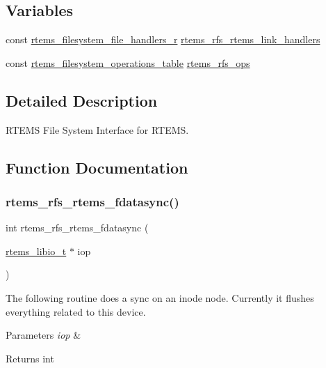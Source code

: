 \subsection*{Variables}
\begin{DoxyCompactItemize}
\item 
const \mbox{\hyperlink{struct__rtems__filesystem__file__handlers__r}{rtems\+\_\+filesystem\+\_\+file\+\_\+handlers\+\_\+r}} \mbox{\hyperlink{rtems-rfs-rtems_8c_a1b1aa463d7b6bd01b968b2d557dd33dd}{rtems\+\_\+rfs\+\_\+rtems\+\_\+link\+\_\+handlers}}
\item 
const \mbox{\hyperlink{struct__rtems__filesystem__operations__table}{rtems\+\_\+filesystem\+\_\+operations\+\_\+table}} \mbox{\hyperlink{rtems-rfs-rtems_8c_a7ad51127fb7bd67172b491a6dfb7d4d9}{rtems\+\_\+rfs\+\_\+ops}}
\end{DoxyCompactItemize}


\subsection{Detailed Description}
R\+T\+E\+MS File System Interface for R\+T\+E\+MS. 



\subsection{Function Documentation}
\mbox{\label{rtems-rfs-rtems_8c_afea85d020da25d7bba8b14906c58a74a}} 
\subsubsection{\texorpdfstring{rtems\_rfs\_rtems\_fdatasync()}{rtems\_rfs\_rtems\_fdatasync()}}
{\footnotesize\ttfamily int rtems\+\_\+rfs\+\_\+rtems\+\_\+fdatasync (\begin{DoxyParamCaption}\item[{\mbox{\hyperlink{structrtems__libio__tt}{rtems\+\_\+libio\+\_\+t}} $\ast$}]{iop }\end{DoxyParamCaption})}

The following routine does a sync on an inode node. Currently it flushes everything related to this device.


\begin{DoxyParams}{Parameters}
{\em iop} & \\
\hline
\end{DoxyParams}
\begin{DoxyReturn}{Returns}
int 
\end{DoxyReturn}
\mbox{\label{rtems-rfs-rtems_8c_a0ceaa395fe3f5ea0c01383618faa3b5c}} 
